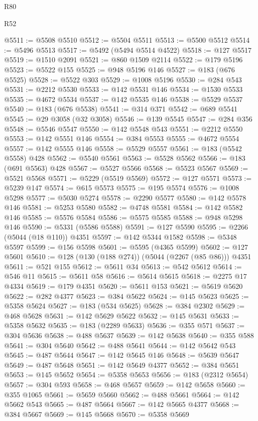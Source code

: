 \begin{lexlean}{R80}
\begin{lexlean}{R52}
\begin{coremodule}
{{{{{{{{{{{{{{{{{{{{{{{{{{{{{{{{{{{{{{{{{{{{{{{{{{{{{{{{{{{{{{{{{{{{{{{{{{{{{{{{{{{{{{{{{{{{{{{{{{{{{{{{{{{{{{{{{{{{{{{{{{{{{{{{{{{{{{{{{{{{{{{{{{{{{{{{{{{{{{{{{{{{{{{{{{{{{{{{{{{{{{{{{{{{{{{{{{{{{{@5511 := @5508 @5510
@5512 := @5504 @5511
@5513 := @5500 @5512
@5514 := @5496 @5513
@5517 := @5492 (@5494 @5514 @4522)
@5518 := @127 @5517
@5519 := @1510 @2091
@5521 := @860 @1509 @2114
@5522 := @179 @5196
@5523 := @5522 @155
@5525 := @948 @5196 @146
@5527 := @183 (@676 @5525)
@5528 := @5522 @303
@5529 := @1008 @5196
@5530 := @284 @543
@5531 := @2212 @5530
@5533 := @142 @5531 @146
@5534 := @1530 @5533
@5535 := @4672 @5534
@5537 := @142 @5535 @146
@5538 := @5529 @5537
@5540 := @183 (@676 @5538)
@5541 := @314 @371
@5542 := @689 @5541
@5545 := @29 @3058 (@32 @3058)
@5546 := @139 @5545
@5547 := @284 @356
@5548 := @5546 @5547
@5550 := @142 @5548 @543
@5551 := @2212 @5550
@5553 := @142 @5551 @146
@5554 := @384 @5553
@5555 := @4672 @5554
@5557 := @142 @5555 @146
@5558 := @5529 @5557
@5561 := @183 (@5542 @5558) @428
@5562 := @5540 @5561
@5563 := @5528 @5562
@5566 := @183 (@691 @5563) @428
@5567 := @5527 @5566
@5568 := @5523 @5567
@5569 := @5521 @5568
@5571 := @5229 (@5519 @5569)
@5572 := @127 @5571
@5573 := @5239 @147
@5574 := @615 @5573
@5575 := @195 @5574
@5576 := @1008 @5298
@5577 := @5030 @5274
@5578 := @2290 @5577
@5580 := @142 @5578 @146
@5581 := @5253 @5580
@5582 := @4748 @5581
@5584 := @142 @5582 @146
@5585 := @5576 @5584
@5586 := @5575 @5585
@5588 := @948 @5298 @146
@5590 := @5331 (@5586 @5588)
@5591 := @127 @5590
@5595 := @2266 (@5044 (@18 @110)) @4351
@5597 := @142 @5344 @1582
@5598 := @5348 @5597
@5599 := @156 @5598
@5601 := @5595 (@4365 @5599)
@5602 := @127 @5601
@5610 := @128 (@130 (@188 @274)) (@5044 (@2267 (@85 @86))) @4351
@5611 := @521 @155
@5612 := @5611 @34
@5613 := @542 @5612
@5614 := @546 @11
@5615 := @5611 @58
@5616 := @5614 @5615
@5618 := @2275 @17 @4334
@5619 := @179 @4351
@5620 := @5611 @153
@5621 := @5619 @5620
@5622 := @282 @4377
@5623 := @384 @5622
@5624 := @145 @5623
@5625 := @5358 @5624
@5627 := @183 (@534 @5625)
@5628 := @384 @2302
@5629 := @468 @5628
@5631 := @142 @5629 @5622
@5632 := @145 @5631
@5633 := @5358 @5632
@5635 := @183 (@2289 @5633)
@5636 := @355 @571
@5637 := @304 @5636
@5638 := @488 @5637
@5639 := @142 @5638
@5640 := @355 @588
@5641 := @304 @5640
@5642 := @488 @5641
@5644 := @142 @5642 @543
@5645 := @487 @5644
@5647 := @142 @5645 @146
@5648 := @5639 @5647
@5649 := @487 @5648
@5651 := @142 @5649 @4377
@5652 := @384 @5651
@5653 := @145 @5652
@5654 := @5358 @5653
@5656 := @183 (@2312 @5654)
@5657 := @304 @593
@5658 := @468 @5657
@5659 := @142 @5658
@5660 := @355 @1065
@5661 := @5659 @5660
@5662 := @488 @5661
@5664 := @142 @5662 @543
@5665 := @487 @5664
@5667 := @142 @5665 @4377
@5668 := @384 @5667
@5669 := @145 @5668
@5670 := @5358 @5669
}}}}}}}}}}}}}}}}}}}}}}}}}}}}}}}}}}}}}}}}}}}}}}}}}}}}}}}}}}}}}}}}}}}}}}}}}}}}}}}}}}}}}}}}}}}}}}}}}}}}}}}}}}}}}}}}}}}}}}}}}}}}}}}}}}}}}}}}}}}}}}}}}}}}}}}}}}}}}}}}}}}}}}}}}}}}}}}}}}}}}}}}}}}}}}}}}}}}}}
\end{coremodule}
\end{lexlean}
\end{lexlean}
